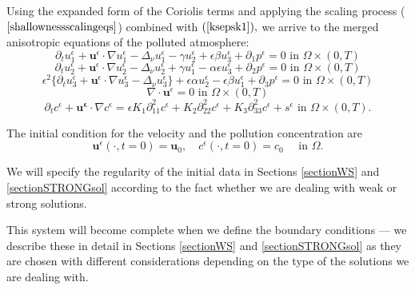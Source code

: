 \documentclass[11pt, a4paper]{article}
\begin{document}
Using the expanded form of the Coriolis terms and applying the scaling process ($\ref{shallownessscalingeqs}$) combined with $(\ref{ksepsk1}),$ we arrive to the merged anisotropic equations of the polluted atmosphere:
%
\begin{equation} \label{ANSC1}
\partial_t u^\epsilon _1 + \mathbf{u}^\epsilon \cdot \nabla u^\epsilon _1 -\Delta_\nu u^\epsilon _1 -\gamma u_2^\epsilon + \epsilon \beta u_3^\epsilon + \partial_1 p^\epsilon = 0 \text{ in } \Omega \times (0,T)
\end{equation}
%
\begin{equation} \label{ANSC2}
\partial_t u_2^\epsilon + \mathbf{u}^\epsilon \cdot \nabla u_2^\epsilon -\Delta_\nu u_2^\epsilon + \gamma u_1^\epsilon - \alpha \epsilon u^\epsilon_3 + \partial_2 p^\epsilon = 0 \text{ in } \Omega \times (0,T)
\end{equation}
%
\begin{equation} \label{ANSC3}
\epsilon^2 \{ \partial_t u_3^\epsilon + \mathbf{u}^\epsilon \cdot \nabla u_3^\epsilon -\Delta_\nu u_3^{\epsilon} \} + \epsilon \alpha u^\epsilon_2 - \epsilon \beta u_1^\epsilon + \partial_3 p^\epsilon = 0 \text{ in } \Omega \times (0,T)
\end{equation}
%
\begin{equation} \label{ANSC4}
\nabla \cdot \mathbf{u}^\epsilon= 0 \text{ in } \Omega \times (0,T)
\end{equation}
%
\begin{equation} \label{ANSC5}
\partial_t c^\epsilon + \mathbf{u^\epsilon} \cdot \nabla c^\epsilon = \epsilon K_1 \partial_{11} ^ 2 c^\epsilon + K_2 \partial_{22} ^ 2 c^\epsilon + K_3 \partial_{33} ^ 2 c^\epsilon + s^\epsilon \text{ in } \Omega \times (0,T).
\end{equation}

The initial condition for the velocity and the pollution concentration are
%
\begin{equation} \label{ANSC_init}
\mathbf{u}^\epsilon (\cdot, t = 0) = \mathbf{u}_0, \quad c^\epsilon (\cdot, t=0) = c_0 \quad \text{ in } \Omega.
\end{equation}

We will specify the regularity of the initial data in Sections \ref{sectionWS} and \ref{sectionSTRONGsol} according to the fact whether we are dealing with weak or strong solutions.

This system will become complete when we define the boundary conditions --- we describe these in detail in Sections \ref{sectionWS} and \ref{sectionSTRONGsol} as they are chosen with different considerations depending on the type of the solutions we are dealing with.
\end{document}
